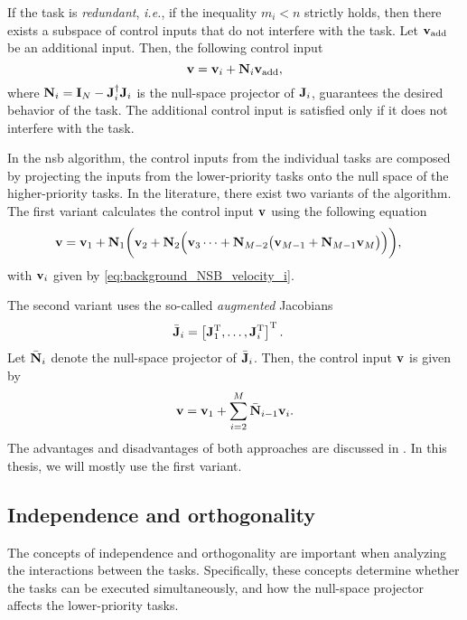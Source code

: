 If the task is \emph{redundant}, \emph{i.e.}, if the inequality $m_i < n$ strictly holds, then there exists a subspace of control inputs that do not interfere with the task.
Let $\mathbf{v}_{\rm add}$ be an additional input.
Then, the following control input
\begin{equation}
    \mathbf{v} = \mathbf{v}_i + \mathbf{N}_i \mathbf{v}_{\rm add},
\end{equation}
where $\mathbf{N}_i = \mathbf{I}_{N} - \mathbf{J}_i^{\dagger}\mathbf{J}_i$ is the null-space projector of $\mathbf{J}_i$, guarantees the desired behavior of the task.
The additional control input is satisfied only if it does not interfere with the task.

In the \gls{nsb} algorithm, the control inputs from the individual tasks are composed by projecting the inputs from the lower-priority tasks onto the null space of the higher-priority tasks.
In the literature, there exist two variants of the algorithm.
The first variant calculates the control input $\mathbf{v}$ using the following equation
\begin{align}
    \mathbf{v} &= \mathbf{v}_{1} + \mathbf{N}_1 \biggl(\mathbf{v}_{2} + \mathbf{N}_2\Bigl(\mathbf{v}_3 \cdots + \mathbf{N}_{M-2}\bigl(\mathbf{v}_{M-1} + \mathbf{N}_{M-1}\mathbf{v}_M\bigr)\Bigr)\biggr),
    \label{eq:background_NSB_recursive}
\end{align}
with $\mathbf{v}_{i}$ given by \eqref{eq:background_NSB_velocity_i}.

The second variant uses the so-called \emph{augmented} Jacobians
\begin{align}
    \Bar{\mathbf{J}}_i &= \left[\mathbf{J}_1^{\mathrm{T}}, \ldots, \mathbf{J}_i^{\mathrm{T}}\right]^{\mathrm{T}}.
    \label{eq:background_NSB_augmented}
\end{align}
Let $\Bar{\mathbf{N}}_i$ denote the null-space projector of $\Bar{\mathbf{J}}_i$.
Then, the control input $\mathbf{v}$ is given by
\begin{equation}
    \mathbf{v} = \mathbf{v}_1 + \sum_{i=2}^M \Bar{\mathbf{N}}_{i-1} \mathbf{v}_i.
\end{equation}
The advantages and disadvantages of both approaches are discussed in \cite{antonelli_stability_2008}.
In this thesis, we will mostly use the first variant.

\subsection{Independence and orthogonality}
\label{sec:background_NSB_independence}
The concepts of independence and orthogonality are important when analyzing the interactions between the tasks.
Specifically, these concepts determine whether the tasks can be executed simultaneously, and how the null-space projector affects the lower-priority tasks.

